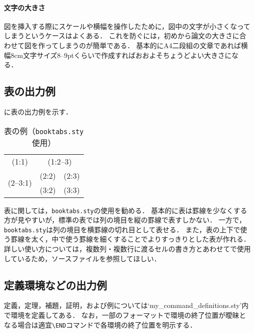 \paragraph{文字の大きさ}

図を挿入する際にスケールや横幅を操作したために，図中の文字が小さくなってしまうというケースはよくある．
これを防ぐには，初めから論文の大きさに合わせて図を作ってしまうのが簡単である．
基本的にA4二段組の文章であれば横幅8cm文字サイズ8--9ptくらいで作成すればおおよそちょうどよい大きさになる．



\subsection{表の出力例}

\Tab{\ref{tab:sample}}に表の出力例を示す．

\begin{table}[t]
  \caption{表の例（\texttt{booktabs.sty}使用）}
  \label{tab:sample}
  \centering \small
  \begin{tabular}{ccc}
    \toprule
    (1:1)                     & \multicolumn{2}{c}{(1:2--3)}         \\
    \cmidrule(r){1-1}\cmidrule(l){2-3}
    \multirow{2}{*}{(2--3:1)} & (2:2)                        & (2:3) \\
                              & (3:2)                        & (3:3) \\
    \bottomrule
  \end{tabular}
\end{table}

表に関しては，\texttt{booktabs.sty}の使用を勧める．
基本的に表は罫線を少なくする方が見やすいが，{\LaTeXe}標準の表では列の境目を縦の罫線で表すしかない．
一方で，\texttt{booktabs.sty}は列の境目を横罫線の切れ目として表せる．
また，表の上下で使う罫線を太く，中で使う罫線を細くすることでよりすっきりとした表が作れる．
詳しい使い方については，複数列・複数行に渡るセルの書き方とあわせて\Tab{\ref{tab:sample}}で使用しているため，ソースファイルを参照してほしい．



\subsection{定義環境などの出力例}

定義，定理，補題，証明，および例については`my\_command\_definitions.sty'内で環境を定義してある．
なお，一部のフォーマットで環境の終了位置が曖昧となる場合は適宜\texttt{\textbackslash END}コマンドで各環境の終了位置を明示する．

